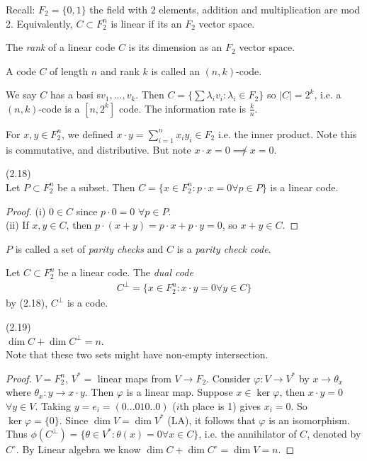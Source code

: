 \documentclass[a4paper]{article}
\begin{document}
Recall: $F_2 =\{0,1\}$ the field with $2$ elements, addition and multiplication are mod 2. Equivalently, $C \subset F_2^n$ is linear if its an $F_2$ vector space.

\begin{defi}
The \emph{rank} of a linear code $C$ is its dimension as an $F_2$ vector space.
\end{defi}

A code $C$ of length $n$ and rank $k$ is called an $(n,k)$-code.

We say $C$ has a basi s$v_1,...,v_k$. Then $C = \{\sum \lambda_i v_i: \lambda_i \in F_2\}$ so $|C|=2^k$, i.e. a $(n,k)$-code is a $[n,2^k]$ code. The information rate is $\frac{k}{n}$.

For $x,y \in F_2^n$, we defined $x \cdot y = \sum_{i=1}^n x_i y_i \in F_2$ i.e. the inner product. Note this is commutative, and distributive. But note $x \cdot x = 0 \not\implies x = 0$.

\begin{lemma} (2.18)\\
Let $P \subset F_2^n$ be a subset. Then $C = \{x \in F_2^n : p \cdot x = 0 \forall p \in P\}$ is a linear code.
\begin{proof}
(i) $0 \in C$ since $p \cdot 0 = 0$ $\forall p \in P$.\\
(ii) If $x,y \in C$, then $p \cdot (x+y) = p\cdot x + p \cdot y = 0$, so $x+y \in C$.
\end{proof}
\end{lemma}

$P$ is called a set of \emph{parity checks} and $C$ is a \emph{parity check code}.

\begin{defi}
Let $C \subset F_2^n$ be a linear code. The \emph{dual code}
\begin{equation*}
\begin{aligned}
C^\perp = \{x \in F_2^n : x \cdot y = 0 \forall y \in C\}
\end{aligned}
\end{equation*}
by (2.18), $C^\perp$ is a code.
\end{defi}

\begin{lemma} (2.19)\\
$\dim C + \dim C^\perp = n$.\\
Note that these two sets might have non-empty intersection.
\begin{proof}
$V=F_2^n$, $V^* = $ linear maps from $V \to F_2$. Consider $\varphi: V \to V^*$ by $x \to \theta_x$ where $\theta_x: y \to x \cdot y$. Then $\varphi$ is a linear map. Suppose $x \in \ker \varphi$, then $x \cdot y = 0$ $\forall y \in V$. Taking $y = e_i = (0...010..0)$ ($i$th place is 1) gives $x_i = 0$. So $\ker \varphi = \{0\}$. Since $\dim V = \dim V^*$ (LA), it follows that $\varphi$ is an isomorphism. Thus $\phi(C^\perp) = \{\theta \in V^*: \theta(x) = 0 \forall x \in C\}$, i.e. the annihilator of $C$, denoted by $C^\circ$. By Linear algebra we know $\dim C + \dim C^\circ = \dim V = n$.
\end{proof}
\end{lemma}
\end{document}

